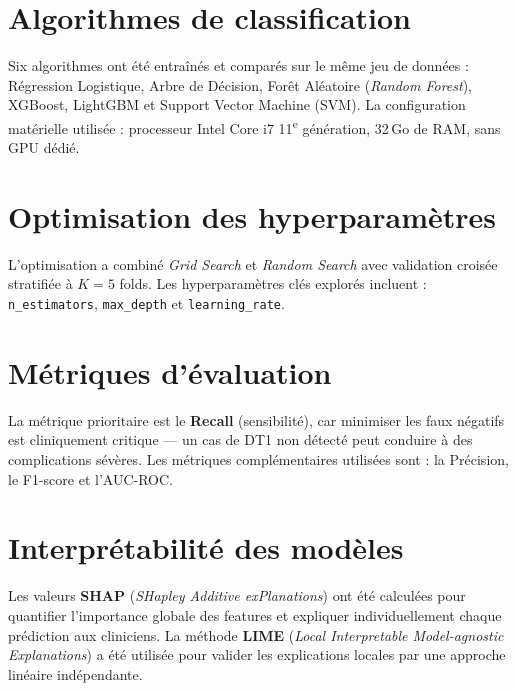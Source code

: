 \section{Algorithmes de classification}
\label{sec:algos}

Six algorithmes ont été entraînés et comparés sur le même jeu de
données : Régression Logistique, Arbre de Décision, Forêt Aléatoire
(\textit{Random Forest}), XGBoost, LightGBM et Support Vector Machine (SVM).
La configuration matérielle utilisée : processeur Intel Core i7 11\textsuperscript{e} génération,
32\,Go de RAM, sans GPU dédié.

\section{Optimisation des hyperparamètres}
\label{sec:hyperparams}

L'optimisation a combiné \textit{Grid Search} et \textit{Random Search}
avec validation croisée stratifiée à $K=5$ folds. Les hyperparamètres clés
explorés incluent : \texttt{n\_estimators}, \texttt{max\_depth} et
\texttt{learning\_rate}.

\section{Métriques d'évaluation}
\label{sec:metriques}

La métrique prioritaire est le \textbf{Recall} (sensibilité), car minimiser les
faux négatifs est cliniquement critique — un cas de DT1 non détecté peut conduire
à des complications sévères. Les métriques complémentaires utilisées sont :
la Précision, le F1-score et l'AUC-ROC.

\section{Interprétabilité des modèles}
\label{sec:interpretabilite}

Les valeurs \textbf{SHAP} (\textit{SHapley Additive exPlanations}) ont été calculées
pour quantifier l'importance globale des features et expliquer individuellement chaque
prédiction aux cliniciens. La méthode \textbf{LIME} (\textit{Local Interpretable
Model-agnostic Explanations}) a été utilisée pour valider les explications locales
par une approche linéaire indépendante.
